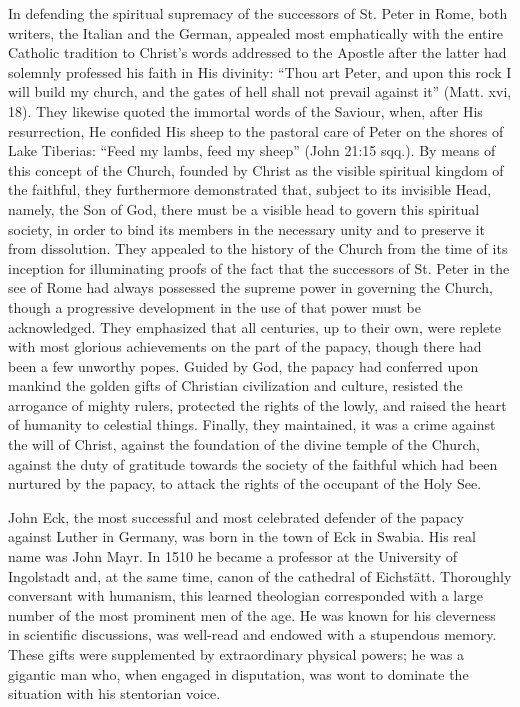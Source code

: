 In defending the spiritual supremacy of the successors of St. Peter
in Rome, both writers, the Italian and the German, appealed most
emphatically with the entire Catholic tradition to Christ’s words addressed
to the Apostle after the latter had solemnly professed his faith
in His divinity: “Thou art Peter, and upon this rock I will build my
church, and the gates of hell shall not prevail against it” (Matt. xvi,
18). They likewise quoted the immortal words of the Saviour, when,
after His resurrection, He confided His sheep to the pastoral care of
Peter on the shores of Lake Tiberias: ``Feed my lambs, feed my sheep''
(John 21:15 sqq.). By means of this concept of the Church, founded
by Christ as the visible spiritual kingdom of the faithful, they furthermore
demonstrated that, subject to its invisible Head, namely, the
Son of God, there must be a visible head to govern this spiritual society,
in order to bind its members in the necessary unity and to preserve
it from dissolution. They appealed to the history of the Church
from the time of its inception for illuminating proofs of the fact that
the successors of St. Peter in the see of Rome had always possessed the
supreme power in governing the Church, though a progressive
development in the use of that power must be acknowledged. They
emphasized that all centuries, up to their own, were replete with most
glorious achievements on the part of the papacy, though there had
been a few unworthy popes. Guided by God, the papacy had conferred
upon mankind the golden gifts of Christian civilization and culture,
resisted the arrogance of mighty rulers, protected the rights of the
lowly, and raised the heart of humanity to celestial things. Finally,
they maintained, it was a crime against the will of Christ, against the
foundation of the divine temple of the Church, against the duty of
gratitude towards the society of the faithful which had been
nurtured by the papacy, to attack the rights of the occupant
of the Holy See.

John Eck, the most successful and most celebrated defender of the
papacy against Luther in Germany, was born in the town of Eck in
Swabia. His real name was John Mayr. In 1510 he became a professor
at the University of Ingolstadt and, at the same time, canon of the
cathedral of Eichstätt. Thoroughly conversant with humanism, this
learned theologian corresponded with a large number of the most
prominent men of the age. He was known for his cleverness in
scientific discussions, was well-read and endowed with a stupendous
memory. These gifts were supplemented by extraordinary physical
powers; he was a gigantic man who, when engaged in disputation,
was wont to dominate the situation with his stentorian voice.

